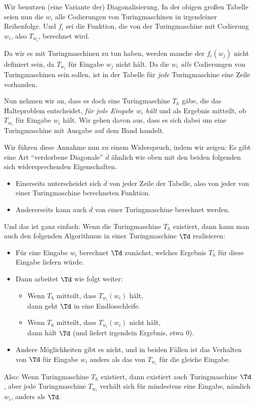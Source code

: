 \begin{beweis}
  Wir benutzen (eine Variante der) Diagonalisierung. In der obigen
  großen Tabelle seien nun die $w_i$ alle Codierungen von
  Turingmaschinen in irgendeiner Reihenfolge. Und $f_i$ sei die
  Funktion, die von der Turingmaschine mit Codierung $w_i$, also
  $T_{w_i}$, berechnet wird.

  Da wir es mit Turingmaschinen zu tun haben, werden manche der
  $f_i(w_j)$ nicht definiert sein, da $T_{w_i}$ für Eingabe $w_j$
  nicht hält. Da die $w_i$ \emph{alle} Codierungen von Turingmaschinen
  sein sollen, ist in der Tabelle für \emph{jede} Turingmaschine eine
  Zeile vorhanden.

  Nun nehmen wir an, dass es doch eine Turingmaschine $T_h$ gäbe, die
  das Halteproblem entscheidet, \dh \emph{für jede Eingabe $w_i$ hält}
  und als Ergebnis mitteilt, ob $T_{w_i}$ für Eingabe $w_i$ hält. Wir
  gehen davon aus, dass es sich dabei um eine Turingmaschine mit
  Ausgabe auf dem Band handelt.

  Wir führen diese Annahme nun zu einem Widerspruch, indem wir zeigen:
  Es gibt eine Art "`verdorbene Diagonale"' $\overline{d}$ ähnlich wie
  oben mit den beiden folgenden sich widersprechenden Eigenschaften.
  \begin{itemize}
  \item Einerseits unterscheidet sich $\overline{d}$ von jeder Zeile
    der Tabelle, also von jeder von einer Turingmaschine berechneten
    Funktion.
  \item Andererseits kann auch $\overline{d}$ von einer Turingmaschine
    berechnet werden.
  \end{itemize}
  Und das ist ganz einfach: Wenn die Turingmaschine $T_h$ existiert,
  dann kann man auch den folgenden Algorithmus in einer Turingmaschine
  $\Td$ realisieren:
  \begin{itemize}
  \item Für eine Eingabe $w_i$ berechnet $\Td$ zunächst, welches
    Ergebnis $T_h$ für diese Eingabe liefern würde.
  \item Dann arbeitet $\Td$ wie folgt weiter:
    \begin{itemize}
    \item Wenn $T_h$ mitteilt, dass $T_{w_i}(w_i)$ hält, \\
      dann geht $\Td$ in eine Endlosschleife.
    \item Wenn $T_h$ mitteilt, dass $T_{w_i}(w_i)$ nicht hält, \\
      dann hält $\Td$ (und liefert irgendein Ergebnis, etwa $0$).
    \end{itemize}
  \item Andere Möglichkeiten gibt es nicht, und in beiden Fällen ist
    das Verhalten von $\Td$ für Eingabe $w_i$ anders als das von
    $T_{w_i}$ für die gleiche Eingabe.
  \end{itemize}
  Also: Wenn Turingmaschine $T_h$ existiert, dann existiert auch
  Turingmaschine $\Td$, aber jede Turingmaschine $T_{w_i}$ verhält
  sich für mindestens eine Eingabe, nämlich $w_i$, anders als $\Td$.


\end{beweis}
